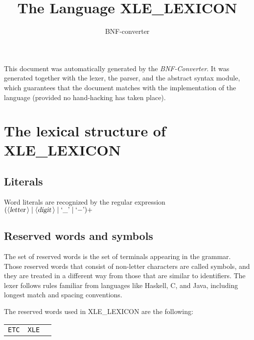 \documentclass[a4paper,11pt]{article}
\author{BNF-converter}
\title{The Language XLE_LEXICON}
\begin{document}
\maketitle

\newcommand{\emptyP}{\mbox{$\epsilon$}}
\newcommand{\terminal}[1]{\mbox{{\texttt {#1}}}}
\newcommand{\nonterminal}[1]{\mbox{$\langle \mbox{{\sl #1 }} \! \rangle$}}
\newcommand{\arrow}{\mbox{::=}}
\newcommand{\delimit}{\mbox{$|$}}
\newcommand{\reserved}[1]{\mbox{{\texttt {#1}}}}
\newcommand{\literal}[1]{\mbox{{\texttt {#1}}}}
\newcommand{\symb}[1]{\mbox{{\texttt {#1}}}}

This document was automatically generated by the {\em BNF-Converter}. It was generated together with the lexer, the parser, and the abstract syntax module, which guarantees that the document matches with the implementation of the language (provided no hand-hacking has taken place).

\section*{The lexical structure of XLE_LEXICON}

\subsection*{Literals}


Word literals are recognized by the regular expression
\(({\nonterminal{letter}} \mid {\nonterminal{digit}} \mid \mbox{`\_'} \mid \mbox{`{$-$}'})+\)


\subsection*{Reserved words and symbols}
The set of reserved words is the set of terminals appearing in the grammar. Those reserved words that consist of non-letter characters are called symbols, and they are treated in a different way from those that are similar to identifiers. The lexer follows rules familiar from languages like Haskell, C, and Java, including longest match and spacing conventions.

The reserved words used in XLE_LEXICON are the following: \\

\begin{tabular}{lll}
{\reserved{ETC}} &{\reserved{XLE}} & \\
\end{tabular}\\
\end{document}

